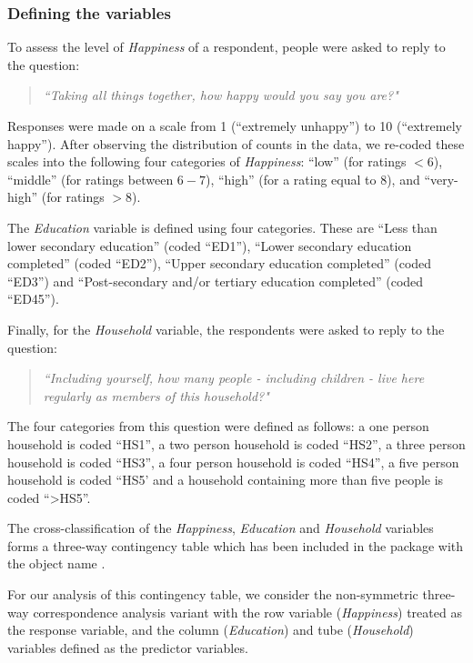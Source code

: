 \subsubsection{Defining the variables}

To assess the level of {\it Happiness} of a respondent, people were asked to reply to the question:

\begin{quote}
\textit{``Taking all things together, how happy would you say you are?"}	
\end{quote}

Responses were made on a scale from 1 (``extremely unhappy'') to 10 (``extremely happy''). After observing the distribution of counts in the data, we re-coded these scales into the following four categories of {\it Happiness}: {``low''} (for ratings  $<6$), {``middle''} (for ratings between $6-7$), {``high''} (for a rating equal to $8$),  and {``very-high''} (for ratings $>8$). 

The {\it Education} variable is defined using four categories. These are {``Less than lower secondary education''} (coded {``ED1''}), {``Lower secondary education completed''} (coded {``ED2''}), {``Upper secondary education completed''} (coded {``ED3''}) and {``Post-secondary and/or  tertiary  education completed''} (coded {``ED45''}). 

Finally, for the {\it Household} variable, the respondents were asked to reply to the question:
\begin{quote}
\textit{``Including yourself, how many people - including children - live here regularly as members of this household?"}
\end{quote}

The four categories from this question were defined as follows: a one person household is coded {``HS1''}, a two person household is coded {``HS2''}, a three person household is coded {``HS3''}, a four person household is coded {``HS4''}, a five person household is coded {``HS5'} and a household containing more than five people is coded {``>HS5''}. 

The cross-classification of the {\it Happiness}, {\it Education} and {\it Household} variables forms a three-way contingency table which has been included in the package with the object name .

For our analysis of this contingency table, we consider the non-symmetric three-way correspondence analysis variant with the row variable ({\it Happiness}) treated as the response variable, and the column ({\it Education}) and tube ({\it Household}) variables defined as the predictor variables. 
 

